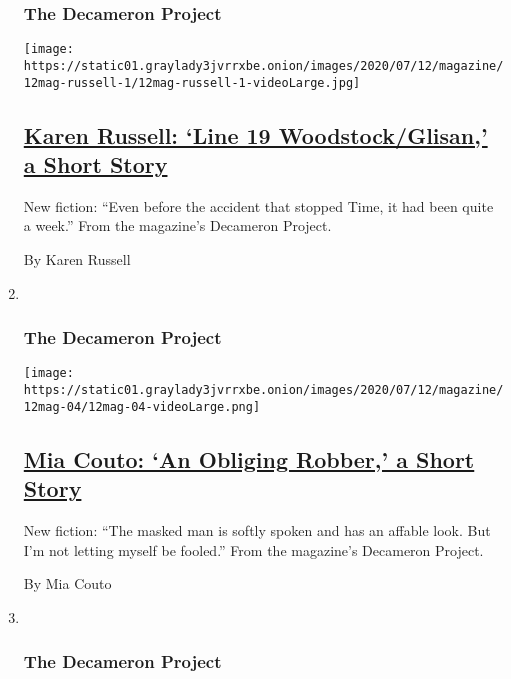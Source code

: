 \begin{enumerate}
{  \subsubsection{The Decameron Project}\label{the-decameron-project-5}}

  \texttt{[image: https://static01.graylady3jvrrxbe.onion/images/2020/07/12/magazine/12mag-russell-1/12mag-russell-1-videoLarge.jpg]}

  \hypertarget{karen-russell-line-19-woodstockglisan-a-short-story}{%
  \subsection{\texorpdfstring{\href{/interactive/2020/07/07/magazine/karen-russell-short-story.html}{Karen
  Russell: `Line 19 Woodstock/Glisan,' a Short
  Story}}{Karen Russell: `Line 19 Woodstock/Glisan,' a Short Story}}\label{karen-russell-line-19-woodstockglisan-a-short-story}}

  New fiction: ``Even before the accident that stopped Time, it had been
  quite a week.'' From the magazine's Decameron Project.

  By Karen Russell
\item ~
  \hypertarget{the-decameron-project-6}{%
  \subsubsection{The Decameron Project}\label{the-decameron-project-6}}

  \texttt{[image: https://static01.graylady3jvrrxbe.onion/images/2020/07/12/magazine/12mag-04/12mag-04-videoLarge.png]}

  \hypertarget{mia-couto-an-obliging-robber-a-short-story}{%
  \subsection{\texorpdfstring{\href{/interactive/2020/07/07/magazine/mia-couto-short-story.html}{Mia
  Couto: `An Obliging Robber,' a Short
  Story}}{Mia Couto: `An Obliging Robber,' a Short Story}}\label{mia-couto-an-obliging-robber-a-short-story}}

  New fiction: ``The masked man is softly spoken and has an affable
  look. But I'm not letting myself be fooled.'' From the magazine's
  Decameron Project.

  By Mia Couto
\item ~
  \hypertarget{the-decameron-project-7}{%
  \subsubsection{The Decameron Project}\label{the-decameron-project-7}}


\end{enumerate}
